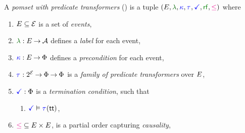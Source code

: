 \begin{definition}
  \label{def:pomset}
  A \emph{pomset with predicate transformers} (\PwT) %
  is a tuple $(\aEvs, \labeling, \labelingForm, \aTr{}{}, \aTerm, {\rrfx}, {\le})$ where
  \begin{enumerate}[,label=(\textsc{m}\arabic*),ref=\textsc{m}\arabic*]
  \item \label{pom-E} 
    $E\subseteq\mathcal{E}$ is a set of \emph{events},
  \item \label{pom-lambda} 
    $\labeling: \aEvs \fun \Act$ defines a \emph{label} for each event,
  \item \label{pom-kappa} 
    ${\color{blue}\kappa}:E\mathbin\rightarrow\Phi$ defines a \emph{precondition} for each event,
  \item \label{pom-tau} 
    $\aTr{}{}:2^{\AllEvents}\fun\Formulae \fun\Formulae$ is a \emph{family of predicate transformers} over $E$, 
  \item \label{pom-term} 
    $\aTerm:\Formulae$ is a \emph{termination condition}, such that 
    \begin{enumerate}
    \item \label{pom-term-tau}
      $\aTerm\rimplies\aTr{}{\TRUE}$,
    \end{enumerate}
  \item \label{pom-le} 
    ${\le} \subseteq \aEvs\times\aEvs$, is a partial order capturing
    \emph{causality},
  \end{enumerate}
  

\end{definition}
